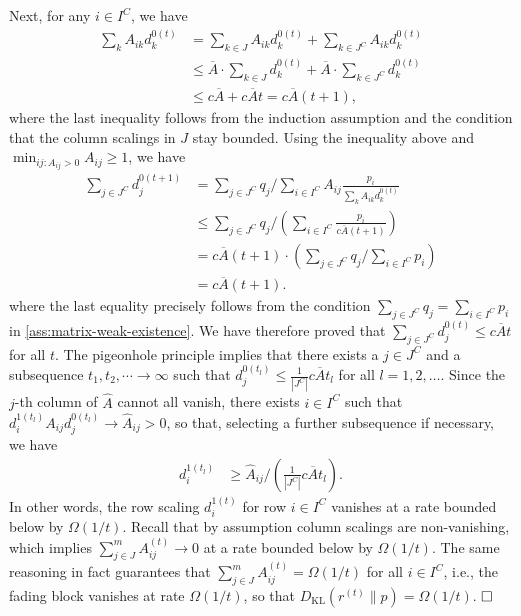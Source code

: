 Next, for any $i\in I^{C}$, we have 
\begin{align*}
\sum_{k}A_{ik}d_{k}^{0(t)} & =\sum_{k\in J}A_{ik}d_{k}^{0(t)}+\sum_{k\in J^{C}}A_{ik}d_{k}^{0(t)}\\
 & \leq\overline{A}\cdot\sum_{k\in J}d_{k}^{0(t)}+\overline{A}\cdot\sum_{k\in J^{C}}d_{k}^{0(t)}\\
 & \leq c\overline{A}+c\overline{A}t=c\overline{A}(t+1),
\end{align*}
 where the last inequality follows from the induction assumption and
the condition that the column scalings in $J$ stay bounded. Using
the inequality above and $\min_{ij:A_{ij}>0}A_{ij}\geq1$, we have
\begin{align*}
\sum_{j\in J^{C}}d_{j}^{0(t+1)} & =\sum_{j\in J^{C}}q_{j}/\sum_{i\in I^{C}}A_{ij}\frac{p_{i}}{\sum_{k}A_{ik}d_{k}^{0(t)}}\\
 & \leq\sum_{j\in J^{C}}q_{j}/(\sum_{i\in I^{C}}\frac{p_{i}}{c\overline{A}(t+1)})\\
 & =c\overline{A}(t+1)\cdot(\sum_{j\in J^{C}}q_{j}/\sum_{i\in I^{C}}p_{i})\\
 & =c\overline{A}(t+1).
\end{align*}
 where the last equality precisely follows from the condition $\sum_{j\in J^{C}}q_{j}=\sum_{i\in I^{C}}p_{i}$
in \cref{ass:matrix-weak-existence}. We have therefore proved that $\sum_{j\in J^{C}}d_{j}^{0(t)}\leq c\overline{A}t$
for all $t$. The pigeonhole principle implies that there exists a
$j\in J^{C}$ and a subsequence $t_{1},t_{2},\cdots\rightarrow\infty$
such that $d_{j}^{0(t_{l})}\leq\frac{1}{|J^{C}|}c\overline{A}t_{l}$
for all $l=1,2,\dots$. Since the $j$-th column of $\hat{A}$ cannot
all vanish, there exists $i\in I^{C}$ such that $d_{i}^{1(t_{l})}A_{ij}d_{j}^{0(t_{l})}\rightarrow\hat{A}_{ij}>0$,
so that, selecting a further subsequence if necessary, we have 
\begin{align*}
d_{i}^{1(t_{l})} & \geq\hat{A}_{ij}/(\frac{1}{|J^{C}|}c\overline{A}t_{l}).
\end{align*}
 In other words, the row scaling $d_{i}^{1(t)}$ for row $i\in I^{C}$
vanishes at a rate bounded below by $\Omega(1/t)$. Recall that by assumption column scalings
are non-vanishing, which implies $\sum_{j\in J}^m A^{(t)}_{ij}\rightarrow 0$ at a rate bounded below by $\Omega(1/t)$. The same reasoning in fact guarantees that $\sum_{j\in J}^m A^{(t)}_{ij}= \Omega(1/t)$ for all $i\in I^C$, i.e., the fading block vanishes at rate $\Omega(1/t)$, so that $D_{\text{KL}}(r^{(t)}\| p)=\Omega(1/t)$.
$\hfill \square$
 
